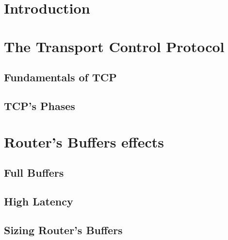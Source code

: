 \documentclass[letter, 11pt]{article}
\theoremstyle{plain}
\theoremstyle{definition}
\begin{document}




\newpage

\tableofcontents
\listoffigures
\listoftables

\newpage

\doublespacing
\section{Introduction}
%

\newpage

%
\section{The Transport Control Protocol}


\subsection{Fundamentals of TCP}


\subsection{TCP's Phases }


\newpage

\section{Router's Buffers effects}

\subsection{Full Buffers}
\subsection{High Latency}
\subsection{Sizing Router's Buffers}
\end{document}
